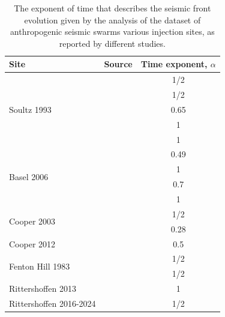 \documentclass[draft]{agujournal2019}
\begin{document}
\begin{table}[htbp]
	\centering
	\caption{The exponent of time that describes the seismic front evolution given by the analysis of the dataset of anthropogenic seismic swarms various injection sites, as reported by different studies.}\label{tab:migration-observations}
	\begin{tabular}{llc}
		\toprule
		Site                              & Source                   & Time exponent, $\alpha$ \\
		\midrule
		\multirow{5}{*}{Soultz 1993}      & \cite{ShapiroEtAl2002}   & 1/2                     \\
		                                  & \cite{GoebelBrodsky2018} & 1/2                     \\
		                                  & \cite{DeBarrosEtAl2021}  & 0.65                    \\
		                                  & \cite{SaezUribe2023}     & 1                       \\
		                                  & \cite{DanreEtAl2024}     & 1                       \\
		\midrule
		\multirow{4}{*}{Basel 2006}       & \cite{JohannEtAl2016}    & 0.49                    \\
		                                  & \cite{GoebelBrodsky2018} & 1                       \\
		                                  & \cite{DeBarrosEtAl2021}  & 0.7                     \\
		                                  & \cite{DanreEtAl2024}     & 1                       \\
		\midrule
		\multirow{2}{*}{Cooper 2003}      & \cite{GoebelBrodsky2018} & 1/2                     \\
		                                  & \cite{JohannEtAl2016}    & 0.28                    \\
		Cooper 2012                       & \cite{DeBarrosEtAl2021}  & 0.5                     \\
		\midrule
		\multirow{2}{*}{Fenton Hill 1983} & \cite{ShapiroEtAl2002}   & 1/2                     \\
		                                  & \cite{GoebelBrodsky2018} & 1/2                     \\
		\midrule
		Rittershoffen 2013                & \cite{LenglineEtAl2017}  & 1                       \\
		Rittershoffen 2016-2024           & \cite{LenglineEtAl2025}  & 1/2                     \\

\end{tabular}
\end{table}
\end{document}
